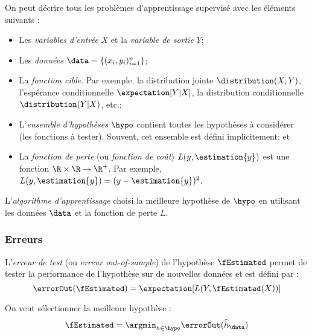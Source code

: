         On peut décrire tous les problèmes d'apprentissage supervisé avec les éléments suivants :
        \begin{itemize}
            \item Les \textit{variables d'entrée} \(X\) et la \textit{variable de sortie} \(Y\);
            \item Les \textit{données} \(\data = \{(x_i, y_i)_{i=1}^n\}\);
            \item La \textit{fonction cible}. Par exemple, la distribution jointe \(\distribution(X, Y)\), l'espérance conditionnelle \(\expectation[Y|X]\), la distribution conditionnelle \(\distribution(Y|X)\), etc.;
            \item L'\textit{ensemble d'hypothèses} \(\hypo\) contient toutes les hypothèses à considérer (les fonctions à tester). Souvent, cet ensemble est défini implicitement; et
            \item La \textit{fonction de perte} (ou \textit{fonction de coût}) \(L(y, \estimation{y})\) est une fonction \(\R \times \R \to \R^+\). Par exemple, \(L(y, \estimation{y}) = (y - \estimation{y})^2\).
        \end{itemize}
        L'\textit{algorithme d'apprentissage} choisi la meilleure hypothèse de \(\hypo\) en utilisant les données \(\data\) et la fonction de perte \(L\).

        \subsubsection{Erreurs}
            \begin{definition}
                L'\textit{erreur de test} (ou \textit{erreur out-of-sample}) de l'hypothèse \(\fEstimated\) permet de tester la performance de l'hypothèse sur de nouvelles données et est défini par :
                \[
                    \errorOut(\fEstimated) = \expectation[L(Y, \fEstimated(X))]
                \]
            \end{definition}

            On veut sélectionner la meilleure hypothèse :
            \[
                \fEstimated = \argmin_{h \in \hypo} \errorOut(\widehat{h}_\data)
            \]

